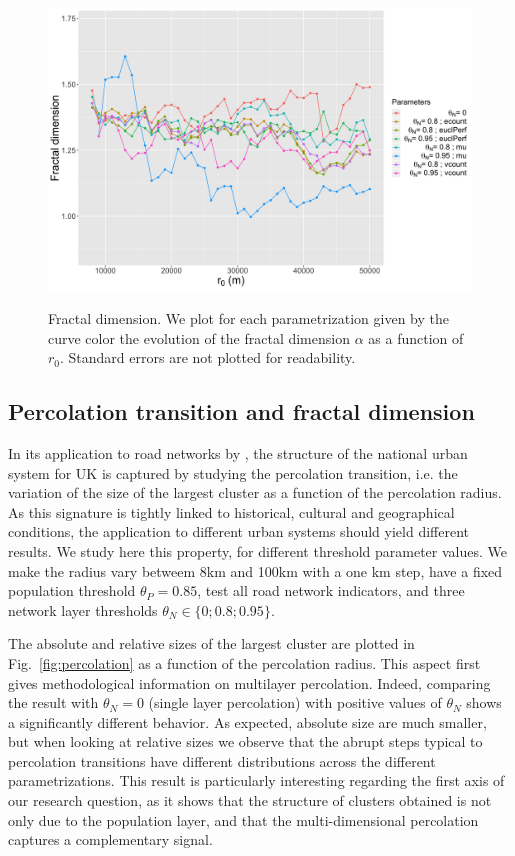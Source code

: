 \documentclass{jimis-en}
\begin{document}
\begin{figure}[ht] 
  {\includegraphics[width=\linewidth]{figures/fractaldimension.png}}
  \centering
  \caption{Fractal dimension. We plot for each parametrization given by the curve color the evolution of the fractal dimension $\alpha$ as a function of $r_0$. Standard errors are not plotted for readability.\label{fig:fractaldim}}
\end{figure}

\subsection{Percolation transition and fractal dimension}



In its application to road networks by \cite{arcaute2016cities}, the structure of the national urban system for UK is captured by studying the percolation transition, i.e. the variation of the size of the largest cluster as a function of the percolation radius. As this signature is tightly linked to historical, cultural and geographical conditions, the application to different urban systems should yield different results. We study here this property, for different threshold parameter values. We make the radius vary betweem 8km and 100km with a one km step, have a fixed population threshold $\theta_P = 0.85$, test all road network indicators, and three network layer thresholds $\theta_N \in \{ 0 ; 0.8 ; 0.95 \}$.

The absolute and relative sizes of the largest cluster are plotted in Fig.~\ref{fig:percolation} as a function of the percolation radius. This aspect first gives methodological information on multilayer percolation. Indeed, comparing the result with $\theta_N = 0$ (single layer percolation) with positive values of $\theta_N$ shows a significantly different behavior. As expected, absolute size are much smaller, but when looking at relative sizes we observe that the abrupt steps typical to percolation transitions have different distributions across the different parametrizations. This result is particularly interesting regarding the first axis of our research question, as it shows that the structure of clusters obtained is not only due to the population layer, and that the multi-dimensional percolation captures a complementary signal.
 
\end{document}
